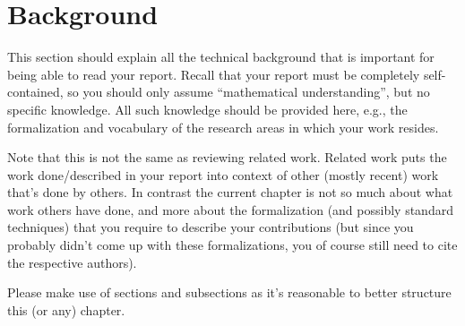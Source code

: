 \chapter{Background}\label{chap:background}

This section should explain all the technical background that is important for being able to read your report. Recall that your report must be completely self-contained, so you should only assume ``mathematical understanding'', but no specific knowledge. All such knowledge should be provided here, e.g., the formalization and vocabulary of the research areas in which your work resides.

Note that this is not the same as reviewing related work. Related work puts the work done/described in your report into context of other (mostly recent) work that's done by others. In contrast the current chapter is not so much about what work others have done, and more about the formalization (and possibly standard techniques) that you require to describe your contributions (but since you probably didn't come up with these formalizations, you of course still need to cite the respective authors).

Please make use of sections and subsections as it's reasonable to better structure this (or any) chapter.
